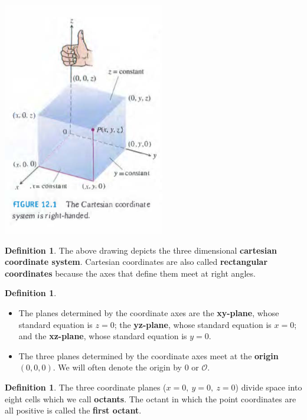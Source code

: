 \documentclass[12pt, letter]{article}
\theoremstyle{plain}
\numberwithin{theorem}{section}
\theoremstyle{definition}
\newtheorem{definition}[theorem]{Definition}
\begin{document}
\begin{center}
\includegraphics[scale=0.8]{m1_f1}
\end{center}

\bigskip

\begin{definition}
The above drawing depicts the three dimensional \textbf{cartesian coordinate system}. Cartesian coordinates are also called \textbf{rectangular coordinates} because the axes that define them meet at right angles.
\end{definition}

\bigskip

\begin{definition}
\begin{itemize}
\item The planes determined by the coordinate axes are the \textbf{xy-plane}, whose standard equation is $z=0$; the \textbf{yz-plane}, whose standard equation is $x=0$; and the \textbf{xz-plane}, whose standard equation is $y=0$.
\item The three planes determined by the coordinate axes meet at the \textbf{origin} $(0,0,0)$. We will often denote the origin by $0$ or $\mathcal{O}$.
\end{itemize}
\end{definition}

\bigskip

\begin{definition}
The three coordinate planes ($x=0, \ y=0, \ z=0$) divide space into eight cells which we call \textbf{octants}. The octant in which the point coordinates are all positive is called the \textbf{first octant}.
\end{definition}
\end{document}
